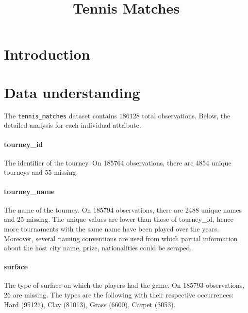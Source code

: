 \documentclass{article}
\title{Tennis Matches}
\begin{document}
    

\tableofcontents
\newpage




\section{Introduction}

\section{Data understanding}
The \texttt{tennis\_matches} dataset contains $186128$ total observations. Below, the detailed analysis for each individual attribute.

\paragraph{tourney\_id}
The identifier of the tourney. On 185764 observations, there are 4854 unique tourneys and 55 missing.

\paragraph{tourney\_name}
The name of the tourney. On 185794 observations, there are 2488 unique names and 25 missing. The unique values are lower than those of tourney\_id, hence more tournaments with the same name have been played over the years. Moreover, several naming conventions are used from which partial information about the host city name, prize, nationalities could be scraped.

\paragraph{surface}
The type of surface on which the players had the game. On 185793 observations, 26 are missing. The types are the following with their respective occurrences: Hard (95127), Clay (81013), Grass (6600), Carpet (3053).
\end{document}
